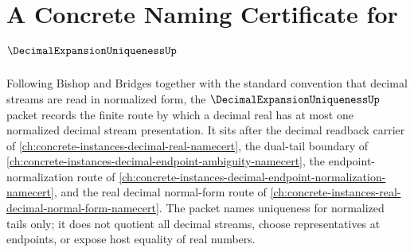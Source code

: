 \chapter{A Concrete Naming Certificate for $\DecimalExpansionUniquenessUp$}
\label{ch:concrete-instances-decimal-expansion-uniqueness-namecert}

Following Bishop and Bridges together with the standard convention that decimal streams are read in normalized form, the $\DecimalExpansionUniquenessUp$ packet records the finite route by which a decimal real has at most one normalized decimal stream presentation. It sits after the decimal readback carrier of \autoref{ch:concrete-instances-decimal-real-namecert}, the dual-tail boundary of \autoref{ch:concrete-instances-decimal-endpoint-ambiguity-namecert}, the endpoint-normalization route of \autoref{ch:concrete-instances-decimal-endpoint-normalization-namecert}, and the real decimal normal-form route of \autoref{ch:concrete-instances-real-decimal-normal-form-namecert}. The packet names uniqueness for normalized tails only; it does not quotient all decimal streams, choose representatives at endpoints, or expose host equality of real numbers.

